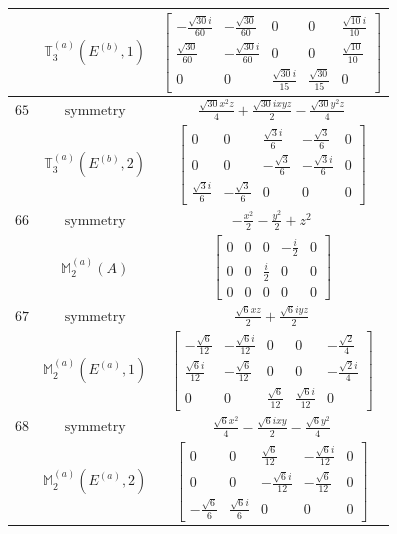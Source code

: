 \documentclass[fleqn,8pt,landscape]{jsarticle}
\begin{document}
\begin{longtable}{ccc}
$  $ & $ \mathbb{T}_{3}^{(a)}(E^{(b)},1) $ & $ \begin{bmatrix} - \frac{\sqrt{30} i}{60} & - \frac{\sqrt{30}}{60} & 0 & 0 & \frac{\sqrt{10} i}{10} \\ \frac{\sqrt{30}}{60} & - \frac{\sqrt{30} i}{60} & 0 & 0 & \frac{\sqrt{10}}{10} \\ 0 & 0 & \frac{\sqrt{30} i}{15} & \frac{\sqrt{30}}{15} & 0 \end{bmatrix} $ \\ \hline
$ 65 $ & $ \text{symmetry} $ & $ \frac{\sqrt{30} x^{2} z}{4} + \frac{\sqrt{30} i x y z}{2} - \frac{\sqrt{30} y^{2} z}{4} $ \\
$  $ & $ \mathbb{T}_{3}^{(a)}(E^{(b)},2) $ & $ \begin{bmatrix} 0 & 0 & \frac{\sqrt{3} i}{6} & - \frac{\sqrt{3}}{6} & 0 \\ 0 & 0 & - \frac{\sqrt{3}}{6} & - \frac{\sqrt{3} i}{6} & 0 \\ \frac{\sqrt{3} i}{6} & - \frac{\sqrt{3}}{6} & 0 & 0 & 0 \end{bmatrix} $ \\ \hline
$ 66 $ & $ \text{symmetry} $ & $ - \frac{x^{2}}{2} - \frac{y^{2}}{2} + z^{2} $ \\
$  $ & $ \mathbb{M}_{2}^{(a)}(A) $ & $ \begin{bmatrix} 0 & 0 & 0 & - \frac{i}{2} & 0 \\ 0 & 0 & \frac{i}{2} & 0 & 0 \\ 0 & 0 & 0 & 0 & 0 \end{bmatrix} $ \\ \hline
$ 67 $ & $ \text{symmetry} $ & $ \frac{\sqrt{6} x z}{2} + \frac{\sqrt{6} i y z}{2} $ \\
$  $ & $ \mathbb{M}_{2}^{(a)}(E^{(a)},1) $ & $ \begin{bmatrix} - \frac{\sqrt{6}}{12} & - \frac{\sqrt{6} i}{12} & 0 & 0 & - \frac{\sqrt{2}}{4} \\ \frac{\sqrt{6} i}{12} & - \frac{\sqrt{6}}{12} & 0 & 0 & - \frac{\sqrt{2} i}{4} \\ 0 & 0 & \frac{\sqrt{6}}{12} & \frac{\sqrt{6} i}{12} & 0 \end{bmatrix} $ \\ \hline
$ 68 $ & $ \text{symmetry} $ & $ \frac{\sqrt{6} x^{2}}{4} - \frac{\sqrt{6} i x y}{2} - \frac{\sqrt{6} y^{2}}{4} $ \\
$  $ & $ \mathbb{M}_{2}^{(a)}(E^{(a)},2) $ & $ \begin{bmatrix} 0 & 0 & \frac{\sqrt{6}}{12} & - \frac{\sqrt{6} i}{12} & 0 \\ 0 & 0 & - \frac{\sqrt{6} i}{12} & - \frac{\sqrt{6}}{12} & 0 \\ - \frac{\sqrt{6}}{6} & \frac{\sqrt{6} i}{6} & 0 & 0 & 0 \end{bmatrix} $ \\ \hline

\end{longtable}
\end{document}
